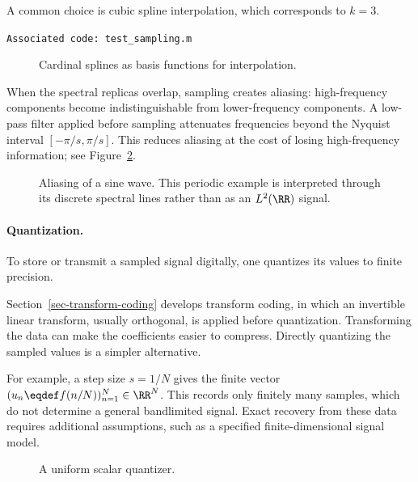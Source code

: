 A common choice is cubic spline interpolation, which corresponds to $k=3$.

\texttt{Associated code: test\_sampling.m}

\begin{figure}[tbp]
\centering
{}
\caption{Cardinal splines as basis functions for interpolation.}
\label{fig-sampling-splines}
\end{figure}



When the spectral replicas overlap, sampling creates aliasing: high-frequency components become indistinguishable from lower-frequency components. A low-pass filter applied before sampling attenuates frequencies beyond the Nyquist interval $[-\pi/s,\pi/s]$. This reduces aliasing at the cost of losing high-frequency information; see Figure~\ref{fig-aliasing}.

\begin{figure}[tbp]
\centering
{}
\caption{Aliasing of a sine wave. This periodic example is interpreted through its discrete spectral lines rather than as an $L^2(\RR)$ signal.}
\label{fig-aliasing}
\end{figure}

   
\paragraph{Quantization.}

To store or transmit a sampled signal digitally, one quantizes its values to finite precision.
  
Section~\ref{sec-transform-coding} develops transform coding, in which an invertible linear transform, usually orthogonal, is applied before quantization. Transforming the data can make the coefficients easier to compress. Directly quantizing the sampled values is a simpler alternative.

For example, a step size $s=1/N$ gives the finite vector $(u_n \eqdef f(n/N))_{n=1}^{N} \in \RR^N$. This records only finitely many samples, which do not determine a general bandlimited signal. Exact recovery from these data requires additional assumptions, such as a specified finite-dimensional signal model.

\begin{figure}[tbp]
\centering
{}
\caption{A uniform scalar quantizer.}
\label{fig-review-shannon-quantizer}
\end{figure}

